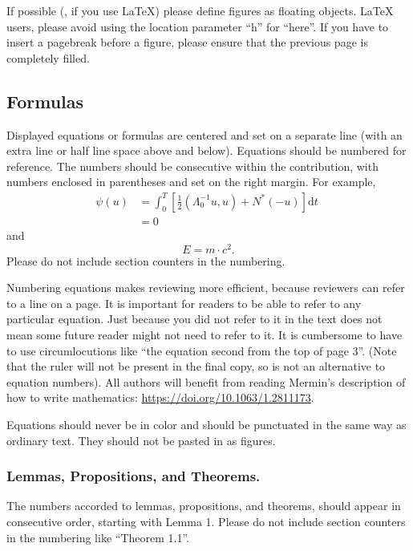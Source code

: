 \documentclass[runningheads]{llncs}
\begin{document}
If possible (\eg, if you use \LaTeX) please define figures as floating objects. 
\LaTeX{} users, please avoid using the location parameter ``h'' for ``here''. 
If you have to insert a pagebreak before a figure, please ensure that the previous page is completely filled.


\subsection{Formulas}
Displayed equations or formulas are centered and set on a separate line (with an extra line or half line space above and below). 
Equations should be numbered for reference. 
The numbers should be consecutive within the contribution, with numbers enclosed in parentheses and set on the right margin.
For example,
\begin{align}
  \psi (u) & = \int_{0}^{T} \left[\frac{1}{2}
  \left(\Lambda_{0}^{-1} u,u\right) + N^{\ast} (-u)\right] \text{d}t \; \\
& = 0
\end{align}
and 
\begin{equation}
  E = m\cdot c^2.
  \label{eq:important}
\end{equation}
Please do not include section counters in the numbering.

Numbering equations makes reviewing more efficient, because reviewers can refer to a line on a page.  
It is important for readers to be able to refer to any particular equation.
Just because you did not refer to it in the text does not mean some future reader might not need to refer to it.
It is cumbersome to have to use circumlocutions like ``the equation second from the top of page 3''.
(Note that the ruler will not be present in the final copy, so is not an alternative to equation numbers).
All authors will benefit from reading Mermin's description of how to write mathematics:
\url{https://doi.org/10.1063/1.2811173}.

Equations should never be in color and should be punctuated in the same way as ordinary text.
They should not be pasted in as figures.


\subsubsection{Lemmas, Propositions, and Theorems.}
The numbers accorded to lemmas, propositions, and theorems, \etc should appear in consecutive order, starting with Lemma 1. 
Please do not include section counters in the numbering like ``Theorem 1.1''.
\end{document}
